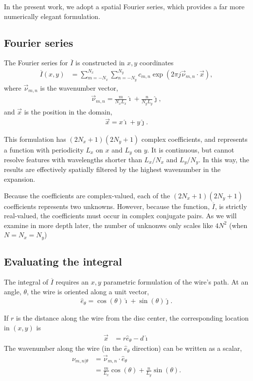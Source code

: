 \documentclass{article}
\def\I{\overline{I}}
\def\x{\vec{x}}
\def\vnu{\vec{\nu}_{m,n}}
\def\nuth{\nu_{m,n|\theta}}
\def\ui{\hat{\imath}}
\def\uj{\hat{\jmath}}
\begin{document}
In the present work, we adopt a spatial Fourier series, which provides a far more numerically elegant formulation.

\subsection{Fourier series}

The Fourier series for $\I$ is constructed in $x,y$ coordinates
\begin{align}
\I(x,y) &= \sum_{m=-N_x}^{N_x} \sum_{n=-N_y}^{N_y} c_{m,n} \exp\left(2\pi j \vnu \cdot \x \right),\label{eqn:Ibar}
\end{align}
where $\vnu$ is the wavenumber vector,
\begin{align}
\vnu = \frac{m}{N_x L_x} \ui + \frac{n}{N_y L_y} \uj,
\end{align}
and $\x$ is the position in the domain,
\begin{align}
\x = x \ui + y \uj.
\end{align}

This formulation has $(2N_x+1)(2N_y+1)$ complex coefficients, and represents a function with periodicity $L_x$ on $x$ and $L_y$ on $y$.  It is continuous, but cannot resolve features with wavelengths shorter than $L_x / N_x$ and $L_y / N_y$.  In this way, the results are effectively spatially filtered by the highest wavenumber in the expansion.

Because the coefficients are complex-valued, each of the $(2N_x+1)(2N_y+1)$ coefficients represents two unknowns.  However, because the function, $\I$, is strictly real-valued, the coefficients must occur in complex conjugate pairs.  As we will examine in more depth later, the number of unknonws only scales like $4N^2$ (when $N = N_x = N_y$)

\subsection{Evaluating the integral}

The integral of $\I$ requires an $x,y$ parametric formulation of the wire's path.  At an angle, $\theta$, the wire is oriented along a unit vector,
\begin{align}
\hat{e}_\theta = \cos(\theta) \ui + \sin(\theta) \uj.
\end{align}


If $r$ is the distance along the wire from the disc center, the corresponding location in $(x,y)$ is
\begin{align}
\x &= r \hat{e}_\theta - d \ui
\end{align}
The wavenumber along the wire (in the $\hat{e}_\theta$ direction) can be written as a scalar,
\begin{align}
\nuth &= \vnu \cdot \hat{e}_\theta\nonumber\\
 &= \frac{m}{L_x} \cos(\theta) + \frac{n}{L_y} \sin(\theta).
\end{align}
\end{document}

